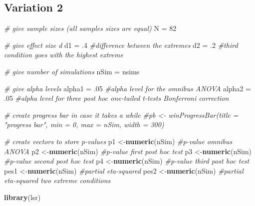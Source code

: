 \documentclass[]{article}
\newenvironment{Shaded}{\begin{snugshade}}{\end{snugshade}}
\newcommand{\KeywordTok}[1]{\textcolor[rgb]{0.13,0.29,0.53}{\textbf{#1}}}
\newcommand{\DecValTok}[1]{\textcolor[rgb]{0.00,0.00,0.81}{#1}}
\newcommand{\FloatTok}[1]{\textcolor[rgb]{0.00,0.00,0.81}{#1}}
\newcommand{\StringTok}[1]{\textcolor[rgb]{0.31,0.60,0.02}{#1}}
\newcommand{\CommentTok}[1]{\textcolor[rgb]{0.56,0.35,0.01}{\textit{#1}}}
\newcommand{\NormalTok}[1]{#1}
\begin{document}
\subsection{Variation 2}\label{variation-2}

\begin{Shaded}
\begin{Highlighting}[]
\CommentTok{# give sample sizes (all samples sizes are equal)}
\NormalTok{N =}\StringTok{ }\DecValTok{82}

\CommentTok{# give effect size d}
\NormalTok{d1 =}\StringTok{ }\FloatTok{.4} \CommentTok{#difference between the extremes}
\NormalTok{d2 =}\StringTok{ }\FloatTok{.2} \CommentTok{#third condition goes with the highest extreme}

\CommentTok{# give number of simulations}
\NormalTok{nSim =}\StringTok{ }\NormalTok{nsims}

\CommentTok{# give alpha levels}
\NormalTok{alpha1 =}\StringTok{ }\FloatTok{.05} \CommentTok{#alpha level for the omnibus ANOVA}
\NormalTok{alpha2 =}\StringTok{ }\FloatTok{.05} \CommentTok{#alpha level for three post hoc one-tailed t-tests Bonferroni correction}

\CommentTok{# create progress bar in case it takes a while}
\CommentTok{#pb <- winProgressBar(title = "progress bar", min = 0, max = nSim, width = 300)}

\CommentTok{# create vectors to store p-values}
\NormalTok{p1 <-}\KeywordTok{numeric}\NormalTok{(nSim) }\CommentTok{#p-value omnibus ANOVA}
\NormalTok{p2 <-}\KeywordTok{numeric}\NormalTok{(nSim) }\CommentTok{#p-value first post hoc test}
\NormalTok{p3 <-}\KeywordTok{numeric}\NormalTok{(nSim) }\CommentTok{#p-value second post hoc test}
\NormalTok{p4 <-}\KeywordTok{numeric}\NormalTok{(nSim) }\CommentTok{#p-value third post hoc test}
\NormalTok{pes1 <-}\KeywordTok{numeric}\NormalTok{(nSim) }\CommentTok{#partial eta-squared}
\NormalTok{pes2 <-}\KeywordTok{numeric}\NormalTok{(nSim) }\CommentTok{#partial eta-squared two extreme conditions}


\KeywordTok{library}\NormalTok{(lsr)}


\end{Highlighting}
\end{Shaded}
\end{document}
